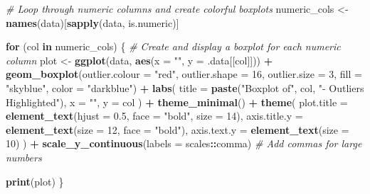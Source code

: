 \documentclass[
]{article}
\newenvironment{Shaded}{\begin{snugshade}}{\end{snugshade}}
\newcommand{\AttributeTok}[1]{\textcolor[rgb]{0.13,0.29,0.53}{#1}}
\newcommand{\CommentTok}[1]{\textcolor[rgb]{0.56,0.35,0.01}{\textit{#1}}}
\newcommand{\ControlFlowTok}[1]{\textcolor[rgb]{0.13,0.29,0.53}{\textbf{#1}}}
\newcommand{\DecValTok}[1]{\textcolor[rgb]{0.00,0.00,0.81}{#1}}
\newcommand{\FloatTok}[1]{\textcolor[rgb]{0.00,0.00,0.81}{#1}}
\newcommand{\FunctionTok}[1]{\textcolor[rgb]{0.13,0.29,0.53}{\textbf{#1}}}
\newcommand{\NormalTok}[1]{#1}
\newcommand{\OtherTok}[1]{\textcolor[rgb]{0.56,0.35,0.01}{#1}}
\newcommand{\SpecialCharTok}[1]{\textcolor[rgb]{0.81,0.36,0.00}{\textbf{#1}}}
\newcommand{\StringTok}[1]{\textcolor[rgb]{0.31,0.60,0.02}{#1}}
\begin{document}
\begin{Shaded}
\begin{Highlighting}[]
\CommentTok{\# Loop through numeric columns and create colorful boxplots}
\NormalTok{numeric\_cols }\OtherTok{\textless{}{-}} \FunctionTok{names}\NormalTok{(data)[}\FunctionTok{sapply}\NormalTok{(data, is.numeric)]}

\ControlFlowTok{for}\NormalTok{ (col }\ControlFlowTok{in}\NormalTok{ numeric\_cols) \{}
  \CommentTok{\# Create and display a boxplot for each numeric column}
\NormalTok{  plot }\OtherTok{\textless{}{-}} \FunctionTok{ggplot}\NormalTok{(data, }\FunctionTok{aes}\NormalTok{(}\AttributeTok{x =} \StringTok{""}\NormalTok{, }\AttributeTok{y =}\NormalTok{ .data[[col]])) }\SpecialCharTok{+}
    \FunctionTok{geom\_boxplot}\NormalTok{(}\AttributeTok{outlier.colour =} \StringTok{"red"}\NormalTok{, }\AttributeTok{outlier.shape =} \DecValTok{16}\NormalTok{, }\AttributeTok{outlier.size =} \DecValTok{3}\NormalTok{, }\AttributeTok{fill =} \StringTok{"skyblue"}\NormalTok{, }\AttributeTok{color =} \StringTok{"darkblue"}\NormalTok{) }\SpecialCharTok{+}
    \FunctionTok{labs}\NormalTok{(}
      \AttributeTok{title =} \FunctionTok{paste}\NormalTok{(}\StringTok{"Boxplot of"}\NormalTok{, col, }\StringTok{"{-} Outliers Highlighted"}\NormalTok{),}
      \AttributeTok{x =} \StringTok{""}\NormalTok{, }\AttributeTok{y =}\NormalTok{ col}
\NormalTok{    ) }\SpecialCharTok{+}
    \FunctionTok{theme\_minimal}\NormalTok{() }\SpecialCharTok{+}
    \FunctionTok{theme}\NormalTok{(}
      \AttributeTok{plot.title =} \FunctionTok{element\_text}\NormalTok{(}\AttributeTok{hjust =} \FloatTok{0.5}\NormalTok{, }\AttributeTok{face =} \StringTok{"bold"}\NormalTok{, }\AttributeTok{size =} \DecValTok{14}\NormalTok{),}
      \AttributeTok{axis.title.y =} \FunctionTok{element\_text}\NormalTok{(}\AttributeTok{size =} \DecValTok{12}\NormalTok{, }\AttributeTok{face =} \StringTok{"bold"}\NormalTok{),}
      \AttributeTok{axis.text.y =} \FunctionTok{element\_text}\NormalTok{(}\AttributeTok{size =} \DecValTok{10}\NormalTok{)}
\NormalTok{    ) }\SpecialCharTok{+}
    \FunctionTok{scale\_y\_continuous}\NormalTok{(}\AttributeTok{labels =}\NormalTok{ scales}\SpecialCharTok{::}\NormalTok{comma)  }\CommentTok{\# Add commas for large numbers}
  
  \FunctionTok{print}\NormalTok{(plot)}
\NormalTok{\}}
\end{Highlighting}
\end{Shaded}
\end{document}
